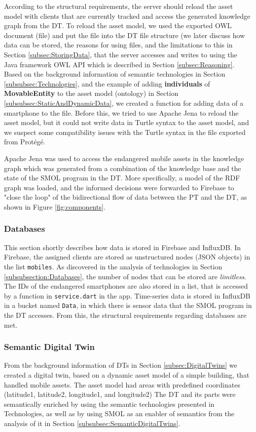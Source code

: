 \documentclass{article}
\begin{document}
According to the structural requirements, the server should reload the asset model with clients that are currently tracked and access the generated knowledge graph from the DT. To reload the asset model, we used the exported OWL document (file) and put the file into the DT file structure (we later discuss how data can be stored, the reasons for using files, and the limitations to this in Section \ref{subsec:StoringData}, that the server accesses and writes to using the Java framework OWL API which is described in Section \ref{subsec:Reasoning}. Based on the background information of semantic technologies in Section \ref{subsubsec:Technologies}, and the example of adding \textbf{individuals} of \textbf{MovableEntity} to the asset model (ontology) in Section \ref{subsubsec:StaticAndDynamicData}, we created a function for adding data of a smartphone to the file. Before this, we tried to use Apache Jena to reload the asset model, but it could not write data in Turtle syntax to the asset model, and we suspect some compatibility issues with the Turtle syntax in the file exported from Protégé.

Apache Jena was used to access the endangered mobile assets in the knowledge graph which was generated from a combination of the knowledge base and the state of the SMOL program in the DT. More specifically, a model of the RDF graph was loaded, and the informed decisions were forwarded to Firebase to "close the loop" of the bidirectional flow of data between the PT and the DT, as shown in Figure \ref{fig:components}.

\subsubsection{Databases}
This section shortly describes how data is stored in Firebase and InfluxDB.
In Firebase, the assigned clients are stored as unstructured nodes (JSON objects) in the list \verb|mobiles|. As discovered in the analysis of technologies in Section \ref{subsubsection:Databases}, the number of nodes that can be stored are \emph{limitless}. The IDs of the endangered smartphones are also stored in a list, that is accessed by a function in \verb|service.dart| in the app. Time-series data is stored in InfluxDB in a bucket named \verb|Data|, in which there is sensor data that the SMOL program in the DT accesses. From this, the structural requirements regarding databases are met.


\subsubsection{Semantic Digital Twin}
From the background information of DTs in Section \ref{subsec:DigitalTwins} we created a digital twin, based on a dynamic asset model of a simple building, that handled mobile assets. The asset model had areas with predefined coordinates (latitude1, latitude2, longitude1, and longitude2) The DT and its parts were semantically enriched by using the semantic technologies presented in Technologies, as well as by using SMOL as an enabler of semantics from the analysis of it in Section \ref{subsubsec:SemanticDigitalTwins}. 
\end{document}
